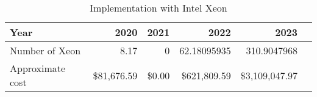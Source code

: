 \tiny \begin{longtable} { |p{}  |r  |r  |r  |r  |r |} 
\caption{Implementation with Intel Xeon \label{tab:Xeon}}\\ 
\hline 
\textbf{Year}&\textbf{2020}&\textbf{2021}&\textbf{2022}&\textbf{2023} \\ \hline
{Number of Xeon}&{8.17}&{0}&{62.18095935}&{310.9047968} \\ \hline
{Approximate cost}&{\$81,676.59}&{\$0.00}&{\$621,809.59}&{\$3,109,047.97} \\ \hline
\end{longtable} \normalsize

